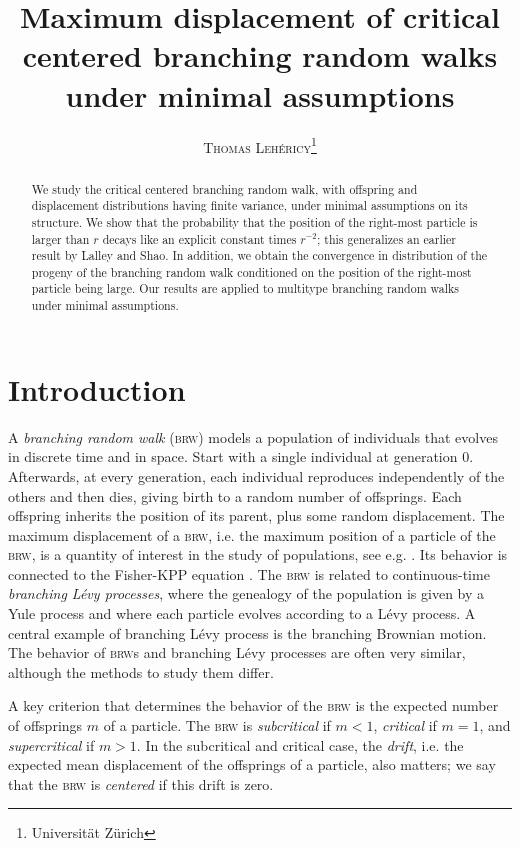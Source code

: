 \documentclass[10pt,a4paper]{article}
\author{\textsc{Thomas Lehéricy}\footnote{Universität Zürich}}
\title{Maximum displacement of critical centered branching random walks under minimal assumptions}
\newcommand{\brw}{\textsc{brw}\xspace}
\newcommand{\brws}{\textsc{brw}s\xspace}
\begin{document}
\maketitle


\begin{abstract}
We study the critical centered branching random walk, with offspring and displacement distributions having finite variance, under minimal assumptions on its structure. We show that the probability that the position of the right-most particle is larger than $r$ decays like an explicit constant times $r^{-2}$; this generalizes an earlier result by Lalley and Shao. In addition, we obtain the convergence in distribution of the progeny of the branching random walk conditioned on the position of the right-most particle being large. Our results are applied to multitype branching random walks under minimal assumptions. 
\end{abstract}



\tableofcontents



\section{Introduction}


A \emph{branching random walk} (\brw{}) models a population of individuals that evolves in discrete time and in space. Start with a single individual at generation 0. Afterwards, at every generation, each individual reproduces independently of the others and then dies, giving birth to a random number of offsprings. Each offspring inherits the position of its parent, plus some random displacement. 
The maximum displacement of a \brw, i.e. the maximum position of a particle of the \brw, is a quantity of interest in the study of populations, see e.g. \cite{sawyer1979maximum}. Its behavior is connected to the Fisher-KPP equation \cite{mckean1975application}. The \brw is related to continuous-time \emph{branching Lévy processes}, where the genealogy of the population is given by a Yule process and where each particle evolves according to a Lévy process. A central example of branching Lévy process is the branching Brownian motion. The behavior of \brws and branching Lévy processes are often very similar, although the methods to study them differ. 

A key criterion that determines the behavior of the \brw is the expected number of offsprings $m$ of a particle. 
The \brw is \emph{subcritical} if $m<1$, \emph{critical} if $m=1$, and \emph{supercritical} if $m>1$. In the subcritical and critical case, the \emph{drift}, i.e. the expected mean displacement of the offsprings of a particle, also matters; we say that the \brw is \emph{centered} if this drift is zero. 
\end{document}
